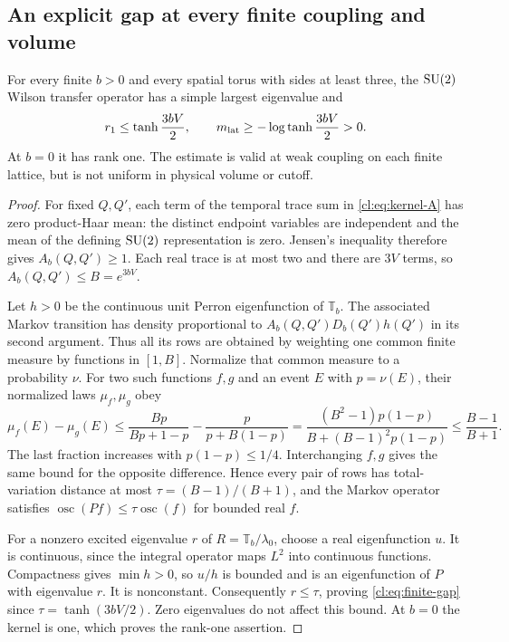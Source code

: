 \subsection{An explicit gap at every finite coupling and volume}
\begin{proposition}\label{cl:prop:finite-gap}
For every finite $b>0$ and every spatial torus with sides at least three,
the $\mathrm{SU}(2)$ Wilson transfer operator has a simple largest eigenvalue and
\begin{equation}\label{cl:eq:finite-gap}
r_1\le\tanh\frac{3bV}{2},\qquad
m_{\rm lat}\ge-\log\tanh\frac{3bV}{2}>0.
\end{equation}
At $b=0$ it has rank one. The estimate is valid at weak coupling on each
finite lattice, but is not uniform in physical volume or cutoff.
\end{proposition}
\begin{proof}
For fixed $Q,Q'$, each term of the temporal trace sum in
\eqref{cl:eq:kernel-A} has zero product-Haar mean: the distinct endpoint
variables are independent and the mean of the defining $\mathrm{SU}(2)$
representation is zero. Jensen's inequality therefore gives
$A_b(Q,Q')\ge1$. Each real trace is at most two and there are $3V$
terms, so $A_b(Q,Q')\le B=e^{3bV}$.

Let $h>0$ be the continuous unit Perron eigenfunction of $\mathbb T_b$.
The associated Markov transition has density proportional to
$A_b(Q,Q')D_b(Q')h(Q')$ in its second argument. Thus all its rows are
obtained by weighting one common finite measure by functions in $[1,B]$.
Normalize that common measure to a probability $\nu$. For two such
functions $f,g$ and an event $E$ with $p=\nu(E)$, their normalized laws
$\mu_f,\mu_g$ obey
\[
\mu_f(E)-\mu_g(E)
\le\frac{Bp}{Bp+1-p}-\frac{p}{p+B(1-p)}
=\frac{(B^2-1)p(1-p)}{B+(B-1)^2p(1-p)}
\le\frac{B-1}{B+1}.
\]
The last fraction increases with $p(1-p)\le1/4$. Interchanging $f,g$
gives the same bound for the opposite difference. Hence every pair of
rows has total-variation distance at most
$\tau=(B-1)/(B+1)$, and the Markov operator satisfies
$\operatorname{osc}(Pf)\le\tau\operatorname{osc}(f)$ for bounded real $f$.

For a nonzero excited eigenvalue $r$ of $R=\mathbb T_b/\lambda_0$,
choose a real eigenfunction $u$. It is continuous, since the integral operator maps
$L^2$ into continuous functions. Compactness gives $\min h>0$, so
$u/h$ is bounded and is an eigenfunction of $P$ with eigenvalue $r$.
It is nonconstant. Consequently $r\le\tau$, proving
\eqref{cl:eq:finite-gap} since $\tau=\tanh(3bV/2)$.
Zero eigenvalues do not affect this bound. At $b=0$ the kernel is one,
which proves the rank-one assertion.
\end{proof}

